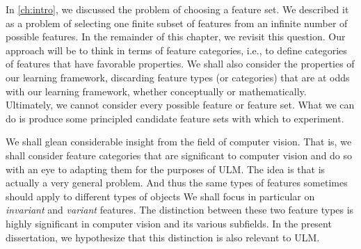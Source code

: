 
In \ref{ch:intro}, we discussed the problem of choosing a feature set. We described it as a problem of selecting one finite subset of 
features from an infinite number of possible features.
In the remainder of this chapter, we revisit this question. Our approach will be to think in terms of feature categories, i.e., to define categories of features that have favorable properties. We shall also consider the properties of our learning framework, discarding feature types (or categories) that are at odds with our learning framework, whether conceptually or mathematically. Ultimately, we cannot consider every possible feature or feature set. What we can do is produce some principled candidate feature sets with which to experiment. 

We shall glean considerable insight
from the field of computer vision. That is, we shall consider feature categories that 
are significant to computer vision and do so with an eye to adapting them for the purposes of ULM. The idea is that 
is actually a very general problem. And thus the
same types of features sometimes should apply to different types of objects
We shall focus in particular on \emph{invariant} and \emph{variant} features. 
The distinction between these two feature types is highly significant in
computer vision and its various subfields. In the present dissertation, we hypothesize that this distinction is
also relevant to ULM. 


